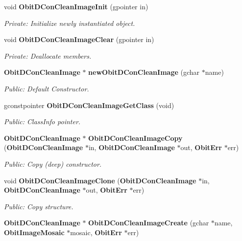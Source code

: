 \begin{CompactItemize}
\item 
void {\bf Obit\-DCon\-Clean\-Image\-Init} (gpointer in)
\begin{CompactList}\small\item\em Private: Initialize newly instantiated object. \item\end{CompactList}\item 
void {\bf Obit\-DCon\-Clean\-Image\-Clear} (gpointer in)
\begin{CompactList}\small\item\em Private: Deallocate members. \item\end{CompactList}\item 
{\bf Obit\-DCon\-Clean\-Image} $\ast$ {\bf new\-Obit\-DCon\-Clean\-Image} (gchar $\ast$name)
\begin{CompactList}\small\item\em Public: Default Constructor. \item\end{CompactList}\item 
gconstpointer {\bf Obit\-DCon\-Clean\-Image\-Get\-Class} (void)
\begin{CompactList}\small\item\em Public: Class\-Info pointer. \item\end{CompactList}\item 
{\bf Obit\-DCon\-Clean\-Image} $\ast$ {\bf Obit\-DCon\-Clean\-Image\-Copy} ({\bf Obit\-DCon\-Clean\-Image} $\ast$in, {\bf Obit\-DCon\-Clean\-Image} $\ast$out, {\bf Obit\-Err} $\ast$err)
\begin{CompactList}\small\item\em Public: Copy (deep) constructor. \item\end{CompactList}\item 
void {\bf Obit\-DCon\-Clean\-Image\-Clone} ({\bf Obit\-DCon\-Clean\-Image} $\ast$in, {\bf Obit\-DCon\-Clean\-Image} $\ast$out, {\bf Obit\-Err} $\ast$err)
\begin{CompactList}\small\item\em Public: Copy structure. \item\end{CompactList}\item 
{\bf Obit\-DCon\-Clean\-Image} $\ast$ {\bf Obit\-DCon\-Clean\-Image\-Create} (gchar $\ast$name, {\bf Obit\-Image\-Mosaic} $\ast$mosaic, {\bf Obit\-Err} $\ast$err)

\end{CompactItemize}
